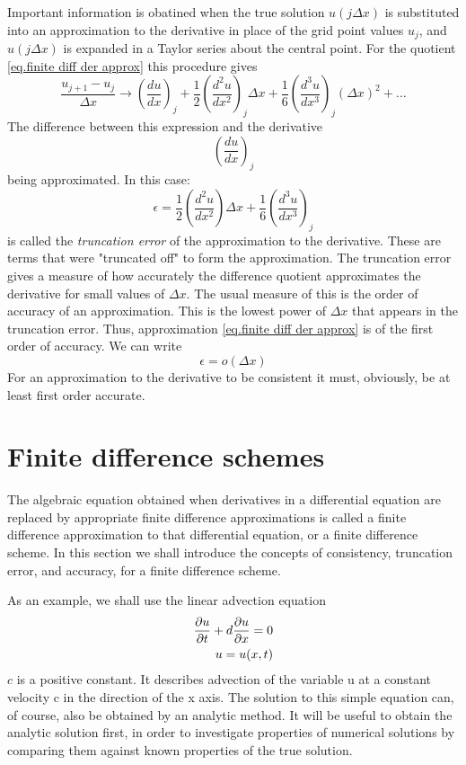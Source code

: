 Important information is obatined when the true solution $u(j\Delta x)$ is substituted into an approximation to the derivative in place of the grid point values $u_j$, and$ u(j\Delta x)$ is expanded in a Taylor series about the central point. For the quotient \ref{eq.finite diff der approx} this procedure gives
\begin{equation}
    \frac{u_{j+1}-u_j}{\Delta x}\rightarrow\left(\frac{du}{dx}\right)_j+\frac{1}{2}\left(\frac{d^2u}{dx^2}\right)_j\Delta x+\frac{1}{6}\left(\frac{d^3u}{dx^3}\right)_j(\Delta x)^2+\dots
\end{equation}
The difference between this expression and the derivative $$\left(\frac{du}{dx}\right)_j$$ being approximated. In this case:
\begin{equation}
    \epsilon= \frac{1}{2}\left(\frac{d^2u}{dx^2}\right)\Delta x+\frac{1}{6}\left(\frac{d^3u}{dx^3}\right)_j
\end{equation}
 is called the \textit{truncation error} of the approximation to the derivative. These are terms that were "truncated off" to form the approximation. The truncation error gives a measure of how accurately the difference quotient approximates the derivative for small values of $\Delta x$. The usual measure of this is the order of accuracy of an approximation. This is the lowest power of $\Delta x$ that appears in the truncation error. Thus, approximation \ref{eq.finite diff der approx}
 is of the first order of accuracy. We can write 
 \begin{equation}
     \epsilon =o(\Delta x)
 \end{equation}
 For an approximation to the derivative to be consistent it must, obviously, be at least first order accurate.
\section{Finite difference schemes}
The algebraic equation obtained when derivatives in a differential equation are replaced by appropriate finite difference approximations is called a finite difference approximation to that differential equation, or a finite difference scheme. In this section we shall introduce the concepts of consistency, truncation error, and accuracy, for a finite difference scheme.

As an example, we shall use the linear advection equation
\begin{align}\label{eq:linear adv eq}
        \frac{\partial u}{\partial t}+d\frac{\partial u}{\partial x}=0 \notag \\
         u=u(x,t)
\end{align}
$c$ is a positive constant.
It describes advection of the variable u at a constant velocity c in the direction of the x axis. The solution to this simple equation can, of course, also be obtained by an analytic method. It will be useful to obtain the analytic solution first, in order to investigate properties of numerical solutions by comparing them against known properties of the true solution. 

